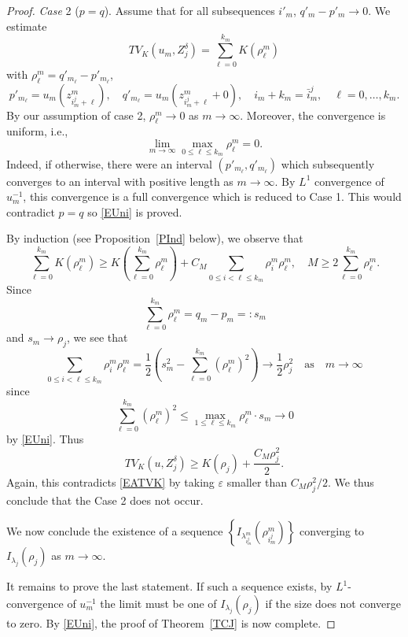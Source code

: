 \documentclass[10pt,a4paper]{amsart}
\begin{document}
\begin{proof}
\noindent
\emph{Case} 2 ($p=q$).
 Assume that for all subsequences $i'_m$, $q'_m-p'_m\to0$.
 We estimate
\[
    TV_K(u_m, Z_j^\delta)
    = \sum_{\ell=0}^{k_m} K(\rho_\ell^m)
\]
with $\rho_\ell^m=q'_{m_\ell}-p'_{m_\ell}$,
\[
    p'_{m_\ell} = u_m(z_{i_m^j+\ell}^m), \quad
    q'_{m_\ell} = u_m(z_{i_m^j+\ell}^m+0), \quad
    i_m + k_m = \bar{i}_m^j, \quad
    \ell=0,\ldots,k_m.
\]
By our assumption of case 2, $\rho_\ell^m\to0$ as $m\to\infty$.
 Moreover, the convergence is uniform, i.e.,
\begin{equation} \label{EUni}
    \lim_{m\to\infty} \max_{0\le\ell\le k_m} \rho_\ell^m = 0.
\end{equation}
Indeed, if otherwise, there were an interval $(p'_{m_\ell},q'_{m_\ell})$ which subsequently converges to an interval with positive length as $m\to\infty$.
 By $L^1$ convergence of $u_m^{-1}$, this convergence is a full convergence which is reduced to Case 1.
 This would contradict $p=q$ so \eqref{EUni} is proved.

By induction (see Proposition~\ref{PInd} below), we observe that
\[
    \sum_{\ell=0}^{k_m} K(\rho_\ell^m)
    \ge K \left(\sum_{\ell=0}^{k_m} \rho_\ell^m \right)
    + C_M \sum_{0\le i<\ell\le k_m} \rho_i^m \rho_\ell^m, \quad
    M \ge 2\sum_{\ell=0}^{k_m} \rho_\ell^m.
\]
Since
\[
    \sum_{\ell=0}^{k_m} \rho_\ell^m
    = q_m - p_m =: s_m
\]
and $s_m\to\rho_j$, we see that
\[
    \sum_{0\le i<\ell\le k_m} \rho_i^m \rho_\ell^m
    = \frac12 \left( s_m^2 - \sum_{\ell=0}^{k_m} (\rho_\ell^m)^2 \right) \to \frac12 \rho_j^2
    \quad\text{as}\quad m \to \infty
\]
since
\[
    \sum_{\ell=0}^{k_m} (\rho_\ell^m)^2
    \le \max_{1\le\ell\le k_m} \rho_\ell^m \cdot s_m \to 0
\]
by \eqref{EUni}.
 Thus
\[
    TV_K(u,Z_j^\delta) \ge K(\rho_j) + \frac{C_M \rho_j^2}{2}.
\]
Again, this contradicts \eqref{EATVK} by taking $\varepsilon$ smaller than $C_M\rho_j^2/2$.
 We thus conclude that the Case 2 does not occur.

We now conclude the existence of a sequence $\left\{I_{\lambda_{i_m^j}^m}(\rho_{i_m^j}^m)\right\}$ converging to $I_{\lambda_j}(\rho_j)$ as $m\to\infty$.

It remains to prove the last statement.
 If such a sequence exists, by $L^1$-convergence of $u_m^{-1}$ the limit must be one of $I_{\lambda_j}(\rho_j)$ if the size does not converge to zero.
 By \eqref{EUni}, the proof of Theorem~\ref{TCJ} is now complete.
\end{proof}
\end{document}
